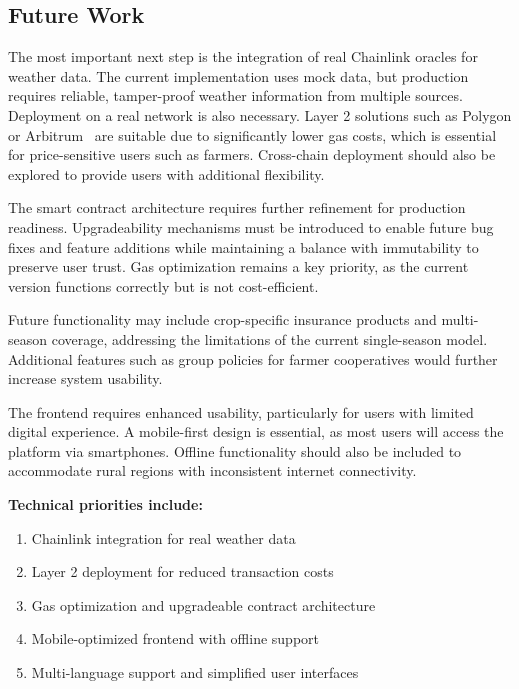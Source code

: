 \documentclass[11pt,a4paper]{article}
\begin{document}
		\subsection{Future Work}\label{subsec:future-work}
		The most important next step is the integration of real Chainlink oracles for weather data.
		The current implementation uses mock data, but production requires reliable, tamper-proof weather information from multiple sources. 
		Deployment on a real network is also necessary. 
		Layer 2\footnotemark{} solutions such as Polygon or Arbitrum~\footnotemark{} are suitable due to significantly lower gas costs, which is essential for price-sensitive users such as farmers.
		Cross-chain deployment should also be explored to provide users with additional flexibility. 

		The smart contract architecture requires further refinement for production readiness. 
		Upgradeability mechanisms must be introduced to enable future bug fixes and feature additions while maintaining a balance with immutability to preserve user trust. 
		Gas optimization remains a key priority, as the current version functions correctly but is not cost-efficient. 

		Future functionality may include crop-specific insurance products and multi-season coverage, addressing the limitations of the current single-season model. 
		Additional features such as group policies for farmer cooperatives would further increase system usability. 

		The frontend requires enhanced usability, particularly for users with limited digital experience. 
		A mobile-first design is essential, as most users will access the platform via smartphones. 
		Offline functionality should also be included to accommodate rural regions with inconsistent internet connectivity. 

		\textbf{Technical priorities include:}

		\begin{enumerate}
			\item Chainlink integration for real weather data
			\item Layer 2 deployment for reduced transaction costs
			\item Gas optimization and upgradeable contract architecture
			\item Mobile-optimized frontend with offline support
			\item Multi-language support and simplified user interfaces
		\end{enumerate}
\end{document}
